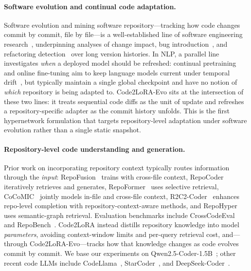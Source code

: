 \documentclass[11pt]{article}
\newcommand{\codelora}{Code2LoRA\xspace}
\newcommand{\codeloraevo}{\codelora-Evo\xspace}
\begin{document}
\paragraph{Software evolution and continual code adaptation.}
Software evolution and mining software repository---tracking how code changes commit by commit, file by file---is a well-established line of software engineering research~\cite{kagdi2007survey,hassan2008road}, underpinning analyses of change impact, bug introduction~\cite{sliwerski2005when}, and refactoring detection~\cite{tsantalis2018refdiff} over long version histories.
In NLP, a parallel line investigates \emph{when} a deployed model should be refreshed: continual pretraining and online fine-tuning aim to keep language models current under temporal drift~\cite{lazaridou2021mind,jang2022continual}, but typically maintain a single global checkpoint and have no notion of \emph{which} repository is being adapted to.
\codeloraevo{} sits at the intersection of these two lines: it treats sequential code diffs as the unit of update and refreshes a repository-specific adapter as the commit history unfolds.
This is the first hypernetwork formulation that targets repository-level adaptation under software evolution rather than a single static snapshot.

\paragraph{Repository-level code understanding and generation.}
Prior work on incorporating repository context typically routes information through the \emph{input}: RepoFusion~\cite{shrivastava2023repofusion} trains with cross-file context, RepoCoder~\cite{zhang2023repocoder} iteratively retrieves and generates, RepoFormer~\cite{wu2024repoformer} uses selective retrieval, CoCoMIC~\cite{ding2024cocomic} jointly models in-file and cross-file context, R2C2-Coder~\cite{deng2024r2c2coder} enhances repo-level completion with repository-context-aware methods, and RepoHyper~\cite{phan2024repohypersearchexpandrefinesemanticgraphs} uses semantic-graph retrieval.
Evaluation benchmarks include CrossCodeEval~\cite{ding2024crosscodeeval} and RepoBench~\cite{liu2023repobenchbenchmarkingrepositorylevelcode}.
\codelora{} instead distills repository knowledge into model \emph{parameters}, avoiding context-window limits and per-query retrieval cost, and---through \codeloraevo{}---tracks how that knowledge changes as code evolves commit by commit.
We base our experiments on Qwen2.5-Coder-1.5B~\cite{hui2024qwen25coder}; other recent code LLMs include CodeLlama~\cite{roziere2023code}, StarCoder~\cite{li2023starcoder}, and DeepSeek-Coder~\cite{guo2024deepseekcoderlargelanguagemodel}.
\end{document}
